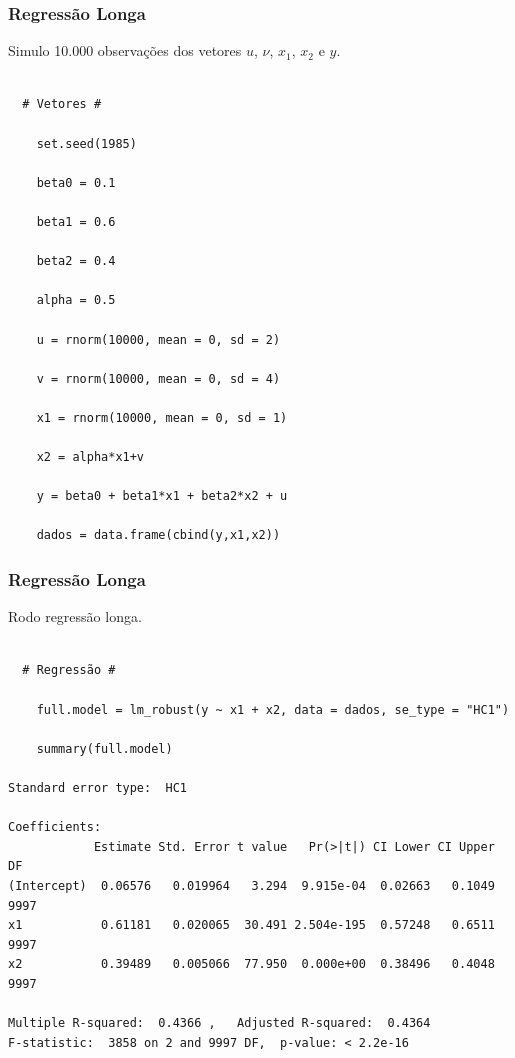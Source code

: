 \documentclass[10pt,slides,xcolor=pdftex,dvipsnames,table]{beamer}
\begin{document}

\begin{frame}[fragile]
	\frametitle{Regressão Longa}

\vspace{0.5cm}
Simulo 10.000 observações dos vetores $u$, $\nu$, $x_1$, $x_2$ e $y$.

\begin{lstlisting}

  # Vetores # 
    
	set.seed(1985)
   
	beta0 = 0.1

	beta1 = 0.6
   
	beta2 = 0.4
 
	alpha = 0.5
   
	u = rnorm(10000, mean = 0, sd = 2)
 
	v = rnorm(10000, mean = 0, sd = 4)

	x1 = rnorm(10000, mean = 0, sd = 1)
 
	x2 = alpha*x1+v
 
	y = beta0 + beta1*x1 + beta2*x2 + u
  
	dados = data.frame(cbind(y,x1,x2))

\end{lstlisting}

\end{frame}


\begin{frame}[fragile]
	\frametitle{Regressão Longa}

\vspace{0.5cm}
Rodo regressão longa.

\begin{lstlisting}

  # Regressão # 
    
	full.model = lm_robust(y ~ x1 + x2, data = dados, se_type = "HC1")
	
	summary(full.model)

Standard error type:  HC1 

Coefficients:
            Estimate Std. Error t value   Pr(>|t|) CI Lower CI Upper   DF
(Intercept)  0.06576   0.019964   3.294  9.915e-04  0.02663   0.1049 9997
x1           0.61181   0.020065  30.491 2.504e-195  0.57248   0.6511 9997
x2           0.39489   0.005066  77.950  0.000e+00  0.38496   0.4048 9997

Multiple R-squared:  0.4366 ,	Adjusted R-squared:  0.4364 
F-statistic:  3858 on 2 and 9997 DF,  p-value: < 2.2e-16

\end{lstlisting}

\end{frame}
\end{document}
